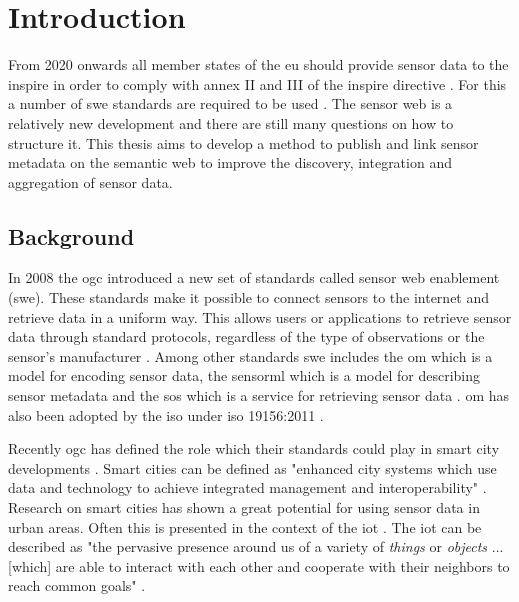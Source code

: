 
\section{Introduction}
\label{chap:introduction}

From 2020 onwards all member states of the \ac{eu} should provide sensor data to the \ac{inspire} in order to comply with annex II and III of the \ac{inspire} directive \citep{SDI:INSPIRE5}. For this a number of \ac{swe} standards are required to be used \citep{SDI:INSPIRE2}. The sensor web is a relatively new development and there are still many questions on how to structure it. This thesis aims to develop a method to publish and link sensor metadata on the semantic web to improve the discovery, integration and aggregation of sensor data.

\subsection{Background}
In 2008 the \ac{ogc} introduced a new set of standards called sensor web enablement (\ac{swe}). These standards make it possible to connect sensors to the internet and retrieve data in a uniform way. This allows users or applications to retrieve sensor data through standard protocols, regardless of the type of observations or the sensor's manufacturer \citep{SW:Botts}. Among other standards \ac{swe} includes the \ac{om} which is a model for encoding sensor data, the \ac{sensorml} which is a model for describing sensor metadata and the \ac{sos} which is a service for retrieving sensor data \citep{SW:OGC}. \ac{om} has also been adopted by the \ac{iso} under \ac{iso} 19156:2011 \citep{SW:ISO}. 

Recently \ac{ogc} has defined the role which their standards could play in smart city developments \citep{SC:OGC}. Smart cities can be defined as "enhanced city systems which use data and technology to achieve integrated management and interoperability" \citep[p. 18]{SC:Moir}. Research on smart cities has shown a great potential for using sensor data in urban areas. Often this is presented in the context of the \ac{iot} \citep{IOT:Zanelli, SSW:Wang2}. The \ac{iot} can be described as "the pervasive presence around us of a variety of \textit{things} or \textit{objects} ... [which] are able to interact with each other and cooperate with their neighbors to reach common goals" \cite[p. 2787]{IOT:Atzori}. 


